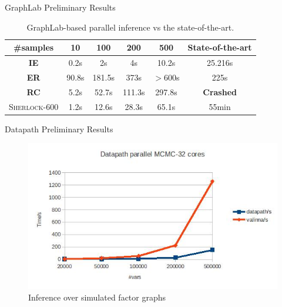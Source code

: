 \documentclass[onlymath,xcolor=pdftex,dvipsnames,table]{beamer}
\newcommand{\sherlock}{\textsc{Sherlock}\xspace}
\begin{document}
\begin{frame}{GraphLab Preliminary Results}
\begin{table}
  \centering
  \begin{tabular}{|cccccc|}\hline
    \textbf{\#samples} & 10 & 100 & 200 & 500 & State-of-the-art\\
    \hline
    \textbf{IE}   & 0.2s & 2s & 4s & 10.2s & 25.216s  \\
    \textbf{ER}   & 90.8s & 181.5s & 373s & $>$600s & 225s \\
    \textbf{RC}   & 5.2s & 52.7s & 111.3s & 297.8s & \textbf{\color{Red}Crashed} \\
    \sherlock-600 & 1.2s & 12.6s & 28.3s & 65.1s & 55min \\
    \hline
  \end{tabular}
  \caption{GraphLab-based parallel inference vs the state-of-the-art.}
\end{table}
\end{frame}

\begin{frame}{Datapath Preliminary Results}
\begin{figure}
  \centering
  \caption{Inference over simulated factor graphs}
  \includegraphics[width=.7\textwidth]{datapath.jpg}
\end{figure}
\end{frame}

\end{document}
